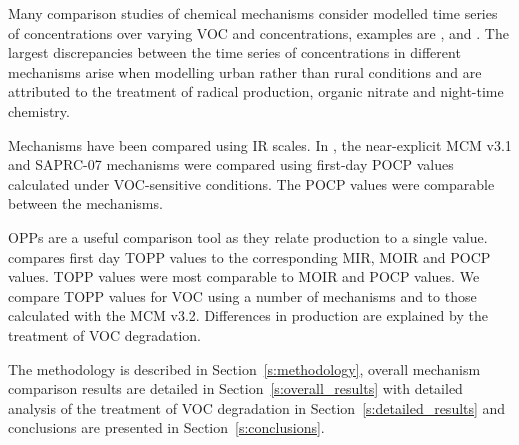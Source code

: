 Many comparison studies of chemical mechanisms consider modelled time series of  concentrations over varying VOC and  concentrations, examples are \citet{Dunker:1984}, \citet{Kuhn:1998} and \citet{Emmerson:2009}.
The largest discrepancies between the time series of  concentrations in different mechanisms arise when modelling urban rather than rural conditions and are attributed to the treatment of radical production, organic nitrate and night-time chemistry.

Mechanisms have been compared using IR scales.
In \citet{Derwent:2010}, the near-explicit MCM v3.1 and SAPRC-07 mechanisms were compared using first-day POCP values calculated under VOC-sensitive conditions. 
The POCP values were comparable between the mechanisms. 

OPPs are a useful comparison tool as they relate  production to a single value. 
\citet{Butler:2011} compares first day TOPP values to the corresponding MIR, MOIR and POCP values.
TOPP values were most comparable to MOIR and POCP values.  
We compare TOPP values for VOC using a number of mechanisms and to those calculated with the MCM v3.2. 
Differences in  production are explained by the treatment of VOC degradation.

The methodology is described in \mbox{Section \ref{s:methodology}}, overall mechanism comparison results are detailed in \mbox{Section \ref{s:overall_results}} with detailed analysis of the treatment of VOC degradation in \mbox{Section \ref{s:detailed_results}} and conclusions are presented in \mbox{Section \ref{s:conclusions}}.
